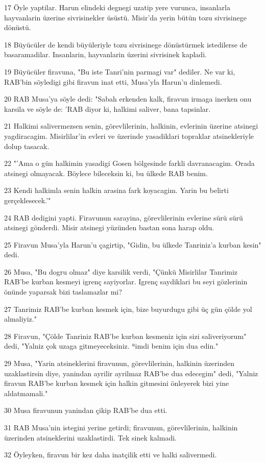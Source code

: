 \par 17 Öyle yaptilar. Harun elindeki degnegi uzatip yere vurunca, insanlarla hayvanlarin üzerine sivrisinekler üsüstü. Misir'da yerin bütün tozu sivrisinege dönüstü.
\par 18 Büyücüler de kendi büyüleriyle tozu sivrisinege dönüstürmek istedilerse de basaramadilar. Insanlarin, hayvanlarin üzerini sivrisinek kapladi.
\par 19 Büyücüler firavuna, "Bu iste Tanri'nin parmagi var" dediler. Ne var ki, RAB'bin söyledigi gibi firavun inat etti, Musa'yla Harun'u dinlemedi.
\par 20 RAB Musa'ya söyle dedi: "Sabah erkenden kalk, firavun irmaga inerken onu karsila ve söyle de: 'RAB diyor ki, halkimi saliver, bana tapsinlar.
\par 21 Halkimi salivermezsen senin, görevlilerinin, halkinin, evlerinin üzerine atsinegi yagdiracagim. Misirlilar'in evleri ve üzerinde yasadiklari topraklar atsinekleriyle dolup tasacak.
\par 22 "'Ama o gün halkimin yasadigi Gosen bölgesinde farkli davranacagim. Orada atsinegi olmayacak. Böylece bileceksin ki, bu ülkede RAB benim.
\par 23 Kendi halkimla senin halkin arasina fark koyacagim. Yarin bu belirti gerçeklesecek.'"
\par 24 RAB dedigini yapti. Firavunun sarayina, görevlilerinin evlerine sürü sürü atsinegi gönderdi. Misir atsinegi yüzünden bastan sona harap oldu.
\par 25 Firavun Musa'yla Harun'u çagirtip, "Gidin, bu ülkede Tanriniz'a kurban kesin" dedi.
\par 26 Musa, "Bu dogru olmaz" diye karsilik verdi, "Çünkü Misirlilar Tanrimiz RAB'be kurban kesmeyi igrenç sayiyorlar. Igrenç saydiklari bu seyi gözlerinin önünde yaparsak bizi taslamazlar mi?
\par 27 Tanrimiz RAB'be kurban kesmek için, bize buyurdugu gibi üç gün çölde yol almaliyiz."
\par 28 Firavun, "Çölde Tanriniz RAB'be kurban kesmeniz için sizi saliveriyorum" dedi, "Yalniz çok uzaga gitmeyeceksiniz. ªimdi benim için dua edin."
\par 29 Musa, "Yarin atsineklerini firavunun, görevlilerinin, halkinin üzerinden uzaklastirsin diye, yanindan ayrilir ayrilmaz RAB'be dua edecegim" dedi, "Yalniz firavun RAB'be kurban kesmek için halkin gitmesini önleyerek bizi yine aldatmamali."
\par 30 Musa firavunun yanindan çikip RAB'be dua etti.
\par 31 RAB Musa'nin istegini yerine getirdi; firavunun, görevlilerinin, halkinin üzerinden atsineklerini uzaklastirdi. Tek sinek kalmadi.
\par 32 Öyleyken, firavun bir kez daha inatçilik etti ve halki salivermedi.


